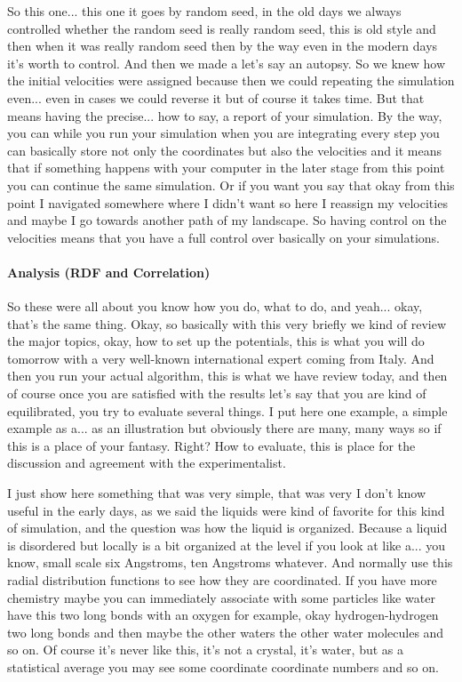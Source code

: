  So this one... this one it goes by random seed, in the old days we always controlled whether the random seed is really random seed, this is old style and then when it was really random seed then by the way even in the modern days it's worth to control. And then we made a let's say an autopsy. So we knew how the initial velocities were assigned because then we could repeating the simulation even... even in cases we could reverse it but of course it takes time. But that means having the precise... how to say, a report of your simulation. By the way, you can while you run your simulation when you are integrating every step you can basically store not only the coordinates but also the velocities and it means that if something happens with your computer in the later stage from this point you can continue the same simulation. Or if you want you say that okay from this point I navigated somewhere where I didn't want so here I reassign my velocities and maybe I go towards another path of my landscape. So having control on the velocities means that you have a full control over basically on your simulations.

\paragraph{Analysis (RDF and Correlation)}
So these were all about you know how you do, what to do, and yeah... okay, that's the same thing. Okay, so basically with this very briefly we kind of review the major topics, okay, how to set up the potentials, this is what you will do tomorrow with a very well-known international expert coming from Italy. And then you run your actual algorithm, this is what we have review today, and then of course once you are satisfied with the results let's say that you are kind of equilibrated, you try to evaluate several things. I put here one example, a simple example as a... as an illustration but obviously there are many, many ways so if this is a place of your fantasy. Right? How to evaluate, this is place for the discussion and agreement with the experimentalist.

I just show here something that was very simple, that was very I don't know useful in the early days, as we said the liquids were kind of favorite for this kind of simulation, and the question was how the liquid is organized. Because a liquid is disordered but locally is a bit organized at the level if you look at like a... you know, small scale six Angstroms, ten Angstroms whatever. And normally use this radial distribution functions to see how they are coordinated. If you have more chemistry maybe you can immediately associate with some particles like water have this two long bonds with an oxygen for example, okay hydrogen-hydrogen two long bonds and then maybe the other waters the other water molecules and so on. Of course it's never like this, it’s not a crystal, it’s water, but as a statistical average you may see some coordinate coordinate numbers and so on.


